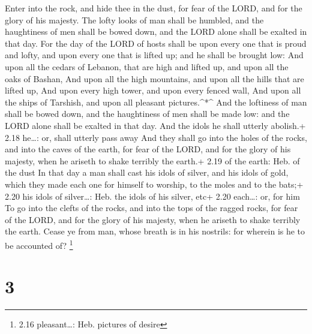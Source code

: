  Enter into the rock, and hide thee in the dust, for fear
of the LORD, and for the glory of his majesty.  The lofty
looks of man shall be humbled, and the haughtiness of men shall be bowed
down, and the LORD alone shall be exalted in that day.  For
the day of the LORD of hosts shall be upon every one that is proud and
lofty, and upon every one that is lifted up; and he shall be brought
low:  And upon all the cedars of Lebanon, that are high and
lifted up, and upon all the oaks of Bashan,  And upon all
the high mountains, and upon all the hills that are lifted up,
 And upon every high tower, and upon every fenced wall,
 And upon all the ships of Tarshish, and upon all pleasant
pictures.\^{}*\^{}  And the loftiness of man shall be bowed
down, and the haughtiness of men shall be made low: and the LORD alone
shall be exalted in that day.  And the idols he shall
utterly abolish.+ 2.18 he\ldots: or, shall utterly pass away
 And they shall go into the holes of the rocks, and into
the caves of the earth, for fear of the LORD, and for the glory of his
majesty, when he ariseth to shake terribly the earth.+ 2.19 of the
earth: Heb. of the dust  In that day a man shall cast his
idols of silver, and his idols of gold, which they made each one for
himself to worship, to the moles and to the bats;+ 2.20 his idols of
silver\ldots: Heb. the idols of his silver, etc+ 2.20 each\ldots: or,
for him  To go into the clefts of the rocks, and into the
tops of the ragged rocks, for fear of the LORD, and for the glory of his
majesty, when he ariseth to shake terribly the earth. 
Cease ye from man, whose breath is in his nostrils: for wherein is he to
be accounted of? \footnote{2.16 pleasant\ldots: Heb. pictures of desire}

\hypertarget{section-2}{%
\section{3}\label{section-2}}

